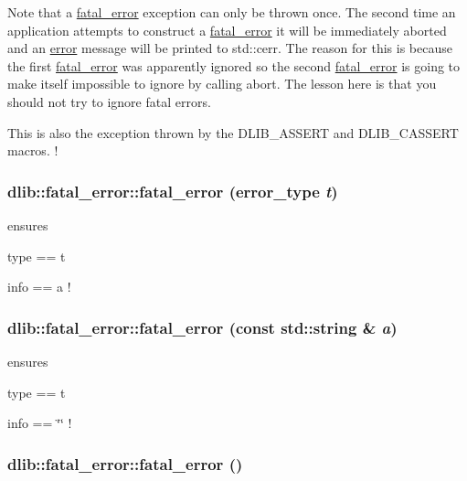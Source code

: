 Note that a \hyperlink{classdlib_1_1fatal__error}{fatal\_\-error} exception can only be thrown once. The second time an application attempts to construct a \hyperlink{classdlib_1_1fatal__error}{fatal\_\-error} it will be immediately aborted and an \hyperlink{classdlib_1_1error}{error} message will be printed to std::cerr. The reason for this is because the first \hyperlink{classdlib_1_1fatal__error}{fatal\_\-error} was apparently ignored so the second \hyperlink{classdlib_1_1fatal__error}{fatal\_\-error} is going to make itself impossible to ignore by calling abort. The lesson here is that you should not try to ignore fatal errors.

This is also the exception thrown by the DLIB\_\-ASSERT and DLIB\_\-CASSERT macros. ! \hypertarget{classdlib_1_1fatal__error_ac947f78667e0aeba05ab738c3ab527d6}{
\subsubsection[{fatal\_\-error}]{\setlength{\rightskip}{0pt plus 5cm}dlib::fatal\_\-error::fatal\_\-error (error\_\-type {\em t})}}
\label{classdlib_1_1fatal__error_ac947f78667e0aeba05ab738c3ab527d6}
ensures
\begin{DoxyItemize}
\item type == t
\item info == a ! 
\end{DoxyItemize}\hypertarget{classdlib_1_1fatal__error_a449542aaaf1cb427faa542bf369ca607}{
\subsubsection[{fatal\_\-error}]{\setlength{\rightskip}{0pt plus 5cm}dlib::fatal\_\-error::fatal\_\-error (const std::string \& {\em a})}}
\label{classdlib_1_1fatal__error_a449542aaaf1cb427faa542bf369ca607}
ensures
\begin{DoxyItemize}
\item type == t
\item info == \char`\"{}\char`\"{} ! 
\end{DoxyItemize}\hypertarget{classdlib_1_1fatal__error_ad824e88fda1a7e4e0fad7b147730dcfc}{
\subsubsection[{fatal\_\-error}]{\setlength{\rightskip}{0pt plus 5cm}dlib::fatal\_\-error::fatal\_\-error ()}}
